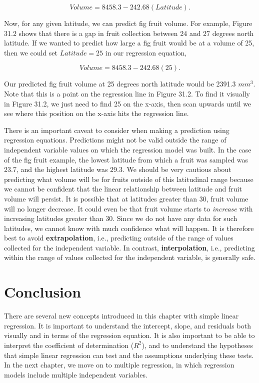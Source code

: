 \documentclass[
]{scrbook}
\begin{document}
\[Volume = 8458.3 - 242.68(Latitude).\]

Now, for any given latitude, we can predict fig fruit volume.
For example, Figure 31.2 shows that there is a gap in fruit collection between 24 and 27 degrees north latitude.
If we wanted to predict how large a fig fruit would be at a volume of 25, then we could set \(Latitude = 25\) in our regression equation,

\[Volume = 8458.3 - 242.68(25).\]

Our predicted fig fruit volume at 25 degrees north latitude would be 2391.3 \(mm^{3}\).
Note that this is a point on the regression line in Figure 31.2.
To find it visually in Figure 31.2, we just need to find 25 on the x-axis, then scan upwards until we see where this position on the x-axis hits the regression line.

There is an important caveat to consider when making a prediction using regression equations.
Predictions might not be valid outside the range of independent variable values on which the regression model was built.
In the case of the fig fruit example, the lowest latitude from which a fruit was sampled was 23.7, and the highest latitude was 29.3.
We should be very cautious about predicting what volume will be for fruits outside of this latitudinal range because we cannot be confident that the linear relationship between latitude and fruit volume will persist.
It is possible that at latitudes greater than 30, fruit volume will no longer decrease.
It could even be that fruit volume starts to \emph{increase} with increasing latitudes greater than 30.
Since we do not have any data for such latitudes, we cannot know with much confidence what will happen.
It is therefore best to avoid \textbf{extrapolation}, i.e., predicting outside of the range of values collected for the independent variable.
In contrast, \textbf{interpolation}, i.e., predicting within the range of values collected for the independent variable, is generally safe.

\hypertarget{conclusion}{%
\section{Conclusion}\label{conclusion}}

There are several new concepts introduced in this chapter with simple linear regression.
It is important to understand the intercept, slope, and residuals both visually and in terms of the regression equation.
It is also important to be able to interpret the coefficient of determination (\(R^{2}\)), and to understand the hypotheses that simple linear regression can test and the assumptions underlying these tests.
In the next chapter, we move on to multiple regression, in which regression models include multiple independent variables.
\end{document}
